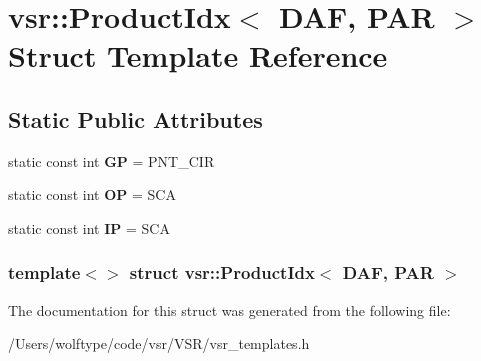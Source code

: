 \hypertarget{structvsr_1_1_product_idx_3_01_d_a_f_00_01_p_a_r_01_4}{\section{vsr\-:\-:Product\-Idx$<$ D\-A\-F, P\-A\-R $>$ Struct Template Reference}
\label{structvsr_1_1_product_idx_3_01_d_a_f_00_01_p_a_r_01_4}
}
\subsection*{Static Public Attributes}
\begin{DoxyCompactItemize}
\item 
\hypertarget{structvsr_1_1_product_idx_3_01_d_a_f_00_01_p_a_r_01_4_af9d7ca9c41a498d3538844020614d8c4}{static const int {\bfseries G\-P} = P\-N\-T\-\_\-\-C\-I\-R}\label{structvsr_1_1_product_idx_3_01_d_a_f_00_01_p_a_r_01_4_af9d7ca9c41a498d3538844020614d8c4}

\item 
\hypertarget{structvsr_1_1_product_idx_3_01_d_a_f_00_01_p_a_r_01_4_aed2a536574cc9a3fcd55463db2b4be68}{static const int {\bfseries O\-P} = S\-C\-A}\label{structvsr_1_1_product_idx_3_01_d_a_f_00_01_p_a_r_01_4_aed2a536574cc9a3fcd55463db2b4be68}

\item 
\hypertarget{structvsr_1_1_product_idx_3_01_d_a_f_00_01_p_a_r_01_4_a7c590ff5b15dfe92b6969bbc53034c26}{static const int {\bfseries I\-P} = S\-C\-A}\label{structvsr_1_1_product_idx_3_01_d_a_f_00_01_p_a_r_01_4_a7c590ff5b15dfe92b6969bbc53034c26}

\end{DoxyCompactItemize}
\subsubsection*{template$<$$>$ struct vsr\-::\-Product\-Idx$<$ D\-A\-F, P\-A\-R $>$}



The documentation for this struct was generated from the following file\-:\begin{DoxyCompactItemize}
\item 
/\-Users/wolftype/code/vsr/\-V\-S\-R/vsr\-\_\-templates.\-h\end{DoxyCompactItemize}
